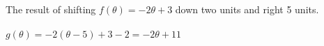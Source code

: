 {The result of shifting $f(\theta) = -2\theta +3$ down two units and right 5 units.}
{\text{}\\ \label{fig:01_05_ex_13}\\
$g(\theta) = -2(\theta-5) + 3 -2=-2\theta + 11$}
